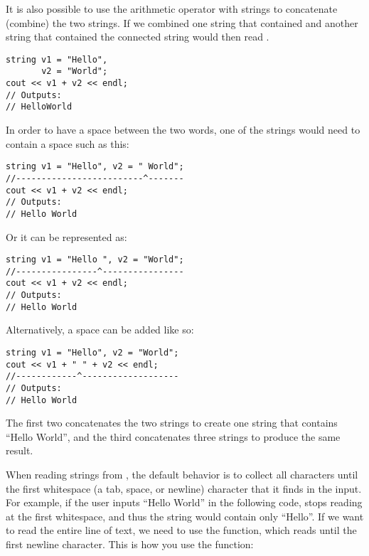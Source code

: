 \noindent It is also possible to use the arithmetic operator \Code{+} with strings to concatenate (combine) the two strings.
If we combined one string that contained  and another string that contained  the connected string would then read .

\noindent\begin{minipage}{\textwidth}\begin{lstlisting}
string v1 = "Hello",
       v2 = "World";
cout << v1 + v2 << endl;
// Outputs:
// HelloWorld
\end{lstlisting}\end{minipage}



In order to have a space between the two words, one of the strings would need to contain a space such as this:

\noindent\begin{minipage}{\textwidth}\begin{lstlisting}
string v1 = "Hello", v2 = " World";
//-------------------------^-------
cout << v1 + v2 << endl;
// Outputs:
// Hello World
\end{lstlisting}\end{minipage}

\noindent Or it can be represented as: 

\noindent\begin{minipage}{\textwidth}\begin{lstlisting}
string v1 = "Hello ", v2 = "World";
//----------------^----------------
cout << v1 + v2 << endl;
// Outputs:
// Hello World
\end{lstlisting}\end{minipage}

\noindent Alternatively, a space can be added like so:

\noindent\begin{minipage}{\textwidth}\begin{lstlisting}
string v1 = "Hello", v2 = "World";
cout << v1 + " " + v2 << endl;
//------------^-------------------
// Outputs:
// Hello World
\end{lstlisting}\end{minipage}

\noindent The first two concatenates the two strings to create one string that contains ``Hello World'', and the third concatenates three strings to produce the same result.

When reading strings from , the default behavior is to collect all characters until the first whitespace (a tab, space, or newline) character that it finds in the input.
For example, if the user inputs ``Hello World'' in the following code,  stops reading at the first whitespace, and thus the string would contain only ``Hello''.
If we want to read the entire line of text, we need to use the  function, which reads until the first newline character.
This is how you use the  function:

